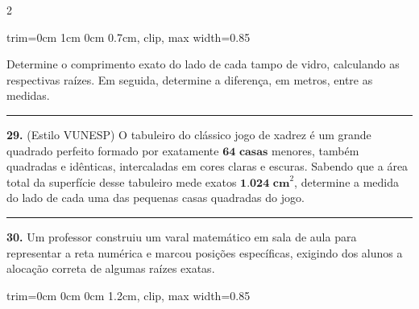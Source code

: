 \documentclass[twoside, 10pt, a4paper]{article}
\newlength{\espacoPreQuestao}\setlength{\espacoPreQuestao}{0.1cm}
\newlength{\espacoQuestao}\setlength{\espacoQuestao}{0.2cm}
\newcommand{\larguraTikz}{0.85\linewidth}
\begin{document}
\begin{multicols*}{2}
\begin{center}
\begin{adjustbox}{trim=0cm 1cm 0cm 0.7cm, clip, max width=\larguraTikz}
\end{adjustbox}
\end{center}
Determine o comprimento exato do lado de cada tampo de vidro, calculando as respectivas raízes. Em seguida, determine a diferença, em metros, entre as medidas.
\par\vspace{\espacoQuestao}
\noindent\textcolor{CorLinha}{\rule{\linewidth}{0.5pt}} 
\par\vspace{\espacoPreQuestao}
\textbf{29.} (Estilo VUNESP) O tabuleiro do clássico jogo de xadrez é um grande quadrado perfeito formado por exatamente $ \textbf{64 casas} $ menores, também quadradas e idênticas, intercaladas em cores claras e escuras. Sabendo que a área total da superfície desse tabuleiro mede exatos $ \textbf{1.024 cm}^{2} $, determine a medida do lado de cada uma das pequenas casas quadradas do jogo.
\par\vspace{\espacoQuestao}

\noindent\textcolor{CorLinha}{\rule{\linewidth}{0.5pt}} 
\par\vspace{\espacoPreQuestao}
\textbf{30.} Um professor construiu um varal matemático em sala de aula para representar a reta numérica e marcou posições específicas, exigindo dos alunos a alocação correta de algumas raízes exatas.
\begin{center}
\begin{adjustbox}{trim=0cm 0cm 0cm 1.2cm, clip, max width=\larguraTikz}
\end{adjustbox}
\end{center}
\end{multicols*}
\end{document}
